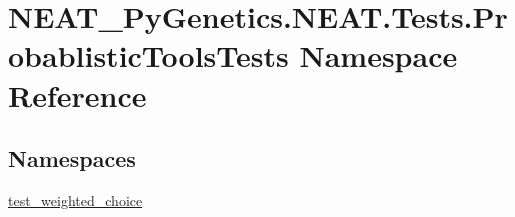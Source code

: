 \hypertarget{namespaceNEAT__PyGenetics_1_1NEAT_1_1Tests_1_1ProbablisticToolsTests}{}\section{N\+E\+A\+T\+\_\+\+Py\+Genetics.\+N\+E\+A\+T.\+Tests.\+Probablistic\+Tools\+Tests Namespace Reference}
\label{namespaceNEAT__PyGenetics_1_1NEAT_1_1Tests_1_1ProbablisticToolsTests}
\subsection*{Namespaces}
\begin{DoxyCompactItemize}
\item 
 \hyperlink{namespaceNEAT__PyGenetics_1_1NEAT_1_1Tests_1_1ProbablisticToolsTests_1_1test__weighted__choice}{test\+\_\+weighted\+\_\+choice}
\end{DoxyCompactItemize}
